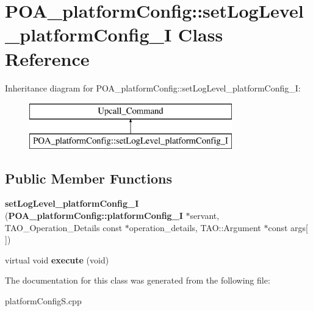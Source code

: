 \section{P\+O\+A\+\_\+platform\+Config\+:\+:set\+Log\+Level\+\_\+platform\+Config\+\_\+I Class Reference}
\label{classPOA__platformConfig_1_1setLogLevel__platformConfig__I}
Inheritance diagram for P\+O\+A\+\_\+platform\+Config\+:\+:set\+Log\+Level\+\_\+platform\+Config\+\_\+I\+:\begin{figure}[H]
\begin{center}
\leavevmode
\includegraphics[height=2.000000cm]{classPOA__platformConfig_1_1setLogLevel__platformConfig__I}
\end{center}
\end{figure}
\subsection*{Public Member Functions}
\begin{DoxyCompactItemize}
\item 
{\bfseries set\+Log\+Level\+\_\+platform\+Config\+\_\+I} ({\bf P\+O\+A\+\_\+platform\+Config\+::platform\+Config\+\_\+I} $\ast$servant, T\+A\+O\+\_\+\+Operation\+\_\+\+Details const $\ast$operation\+\_\+details, T\+A\+O\+::\+Argument $\ast$const args[$\,$])\label{classPOA__platformConfig_1_1setLogLevel__platformConfig__I_a799603576e0d4638a3e1013ac6bc6c67}

\item 
virtual void {\bfseries execute} (void)\label{classPOA__platformConfig_1_1setLogLevel__platformConfig__I_aeb0e6c2918c14525dd218dda47407602}

\end{DoxyCompactItemize}


The documentation for this class was generated from the following file\+:\begin{DoxyCompactItemize}
\item 
platform\+Config\+S.\+cpp\end{DoxyCompactItemize}

